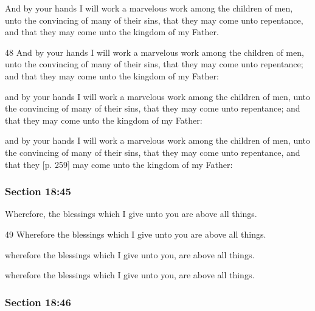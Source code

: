		And by your hands I will work a marvelous work among the children of men, unto the convincing of many of their sins, that they may come unto repentance, and that they may come unto the kingdom of my Father.

		\begin{framed}
		\scriptsize
			\begin{compactdesc}
				\item[JSP] 48 And by your hands I will work a marvelous work among the children of men, unto the convincing of many of their sins, that they may come unto repentance; and that they may come unto the kingdom of my Father:
				\item[DC 1835] and by your hands I will work a marvelous work among the children of men, unto the convincing of many of their sins, that they may come unto repentance; and that they may come unto the kingdom of my Father: 
				\item[DC 1844] and by your hands I will work a marvelous work among the children of men, unto the convincing of many of their sins, that they may come unto repentance, and that they [p. 259] may come unto the kingdom of my Father: 
			\end{compactdesc}
		\end{framed}

	\subsubsection{Section 18:45} %
		\label{DC18-45}

		Wherefore, the blessings which I give unto you are above all things.

		\begin{framed}
		\scriptsize
			\begin{compactdesc}
				\item[JSP] 49 Wherefore the blessings which I give unto you are above all things.
				\item[DC 1835] wherefore the blessings which I give unto you, are above all things. 
				\item[DC 1844] wherefore the blessings which I give unto you, are above all things. 
			\end{compactdesc}
		\end{framed}

	\subsubsection{Section 18:46} %
		\label{DC18-46}


